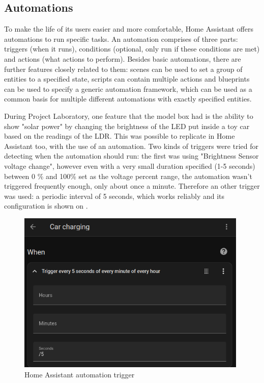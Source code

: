 \subsection{Automations}

To make the life of its users easier and more comfortable, Home Assistant offers automations to run specific tasks. An automation comprises of three parts: triggers (when it runs), conditions (optional, only run if these conditions are met) and actions (what actions to perform). \cite{HAAutomationBasics} Besides basic automations, there are further features closely related to them: scenes can be used to set a group of entities to a specified state, scripts can contain multiple actions and blueprints can be used to specify a generic automation framework, which can be used as a common basis for multiple different automations with exactly specified entities.

During Project Laboratory, one feature that the model box had is the ability to show "solar power" by changing the brightness of the LED put inside a toy car based on the readings of the LDR. This was possible to replicate in Home Assistant too, with the use of an automation. Two kinds of triggers were tried for detecting when the automation should run: the first was using "Brightness Sensor voltage change", however even with a very small duration specified (1-5 seconds) between 0 \% and 100\% set as the voltage percent range, the automation wasn't triggered frequently enough, only about once a minute. Therefore an other trigger was used: a periodic interval of 5 seconds, which works reliably and its configuration is shown on .

\begin{figure}[!ht]
  \centering
  \includegraphics[width=110mm, keepaspectratio]{figures/homeassistant_automation_trigger.png}
  \caption{Home Assistant automation trigger}
  \label{fig:HAautomationTrigger}
\end{figure}

